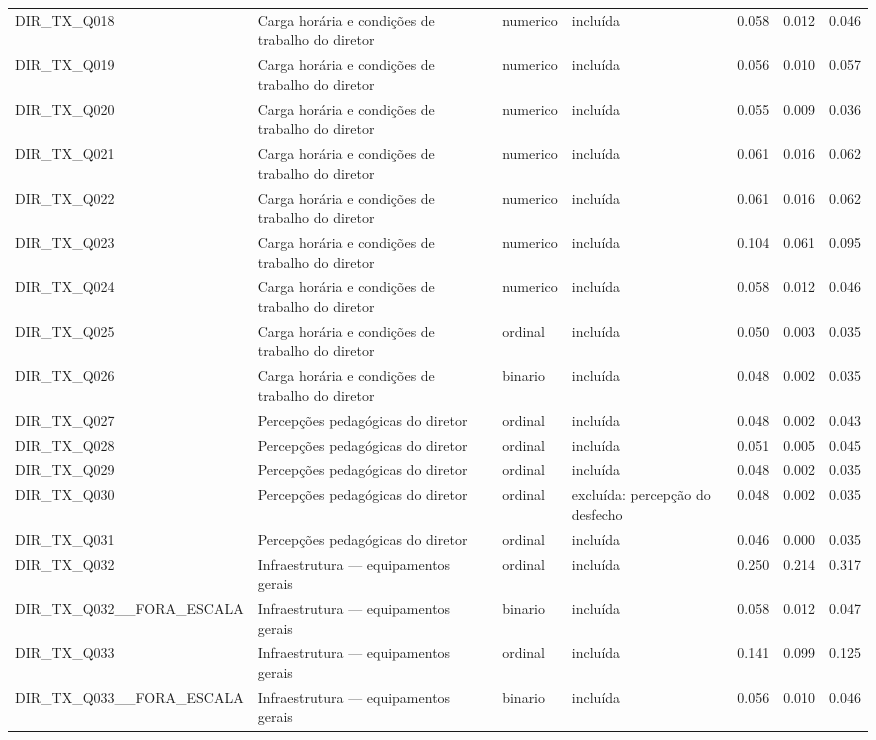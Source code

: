 \begin{tabular}{llllrrr}
DIR\_TX\_Q018 & Carga horária e condições de trabalho do diretor & numerico & incluída & 0.058 & 0.012 & 0.046 \\
DIR\_TX\_Q019 & Carga horária e condições de trabalho do diretor & numerico & incluída & 0.056 & 0.010 & 0.057 \\
DIR\_TX\_Q020 & Carga horária e condições de trabalho do diretor & numerico & incluída & 0.055 & 0.009 & 0.036 \\
DIR\_TX\_Q021 & Carga horária e condições de trabalho do diretor & numerico & incluída & 0.061 & 0.016 & 0.062 \\
DIR\_TX\_Q022 & Carga horária e condições de trabalho do diretor & numerico & incluída & 0.061 & 0.016 & 0.062 \\
DIR\_TX\_Q023 & Carga horária e condições de trabalho do diretor & numerico & incluída & 0.104 & 0.061 & 0.095 \\
DIR\_TX\_Q024 & Carga horária e condições de trabalho do diretor & numerico & incluída & 0.058 & 0.012 & 0.046 \\
DIR\_TX\_Q025 & Carga horária e condições de trabalho do diretor & ordinal & incluída & 0.050 & 0.003 & 0.035 \\
DIR\_TX\_Q026 & Carga horária e condições de trabalho do diretor & binario & incluída & 0.048 & 0.002 & 0.035 \\
DIR\_TX\_Q027 & Percepções pedagógicas do diretor & ordinal & incluída & 0.048 & 0.002 & 0.043 \\
DIR\_TX\_Q028 & Percepções pedagógicas do diretor & ordinal & incluída & 0.051 & 0.005 & 0.045 \\
DIR\_TX\_Q029 & Percepções pedagógicas do diretor & ordinal & incluída & 0.048 & 0.002 & 0.035 \\
DIR\_TX\_Q030 & Percepções pedagógicas do diretor & ordinal & excluída: percepção do desfecho & 0.048 & 0.002 & 0.035 \\
DIR\_TX\_Q031 & Percepções pedagógicas do diretor & ordinal & incluída & 0.046 & 0.000 & 0.035 \\
DIR\_TX\_Q032 & Infraestrutura — equipamentos gerais & ordinal & incluída & 0.250 & 0.214 & 0.317 \\
DIR\_TX\_Q032\_\_FORA\_ESCALA & Infraestrutura — equipamentos gerais & binario & incluída & 0.058 & 0.012 & 0.047 \\
DIR\_TX\_Q033 & Infraestrutura — equipamentos gerais & ordinal & incluída & 0.141 & 0.099 & 0.125 \\
DIR\_TX\_Q033\_\_FORA\_ESCALA & Infraestrutura — equipamentos gerais & binario & incluída & 0.056 & 0.010 & 0.046 \\

\end{tabular}
